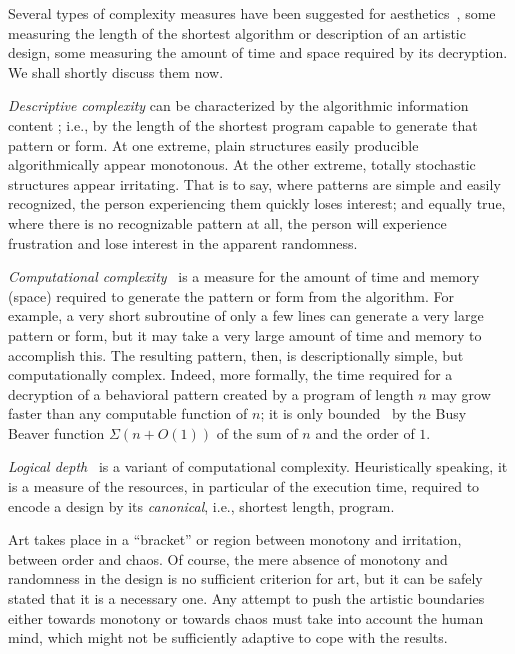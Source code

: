 \documentclass[%
 reprint,
 showpacs,
 showkeys,
 amsmath,
 amssymb,
 aps,
 pra,
 longbibliography,
 floatfix,
 ]{revtex4-1}
\begin{document}
Several types of complexity measures have been suggested for aesthetics~\cite{birkhoff-33,Staudek:Birkhoffs:1999:HE,casti:03-aesthetics,10.1109/MCG.2008.34},
some measuring the length of the shortest algorithm or description of an artistic design, some measuring the amount of time and space required by its decryption.
We shall shortly discuss them now.

\textit{Descriptive complexity} can be characterized by the algorithmic information content
\cite{chaitin2,chaitin3,calude:02};
i.e., by the length of the shortest program capable to generate that pattern or form.
At one extreme, plain structures easily producible algorithmically appear monotonous.
At the other extreme, totally stochastic structures
appear irritating. That is to say, where patterns are simple and easily
recognized, the person experiencing them quickly loses interest; and equally
true, where there is no recognizable pattern at all, the person will experience frustration and lose interest in the apparent randomness.


\textit{Computational complexity}~\cite{calude1,bennett-utm}
is a measure for the amount of time and
memory (space) required to generate the pattern or form from the algorithm.
For example, a very short subroutine of only a few lines can generate a very
large pattern or form, but it may take a very large amount of time and
memory to accomplish this. The resulting pattern, then, is descriptionally
simple, but computationally complex.
Indeed, more formally, the time required for a decryption of a behavioral pattern created by a program of length $n$ may grow faster than any computable function of $n$;
it is only bounded~\cite{rado,chaitin-ACM,dewdney,brady} by the Busy Beaver function $\Sigma (n+O(1))$ of the sum of $n$ and the order of $1$.

\textit{Logical depth}~\cite{ch6,bennett1,bennett-utm}
is a variant of computational complexity.
Heuristically speaking, it is a measure of the resources, in particular of the execution time, required to encode a design by its {\em canonical}, i.e., shortest length, program.

Art takes place in a ``bracket'' or region between monotony and irritation, between order and chaos.
Of course, the mere absence of monotony and randomness in the design is no sufficient criterion for art, but it can be safely stated that it is a necessary one.
Any attempt to push the artistic boundaries either towards monotony or towards
chaos must take into account the human mind, which might not be sufficiently adaptive to cope with the results.
\end{document}

